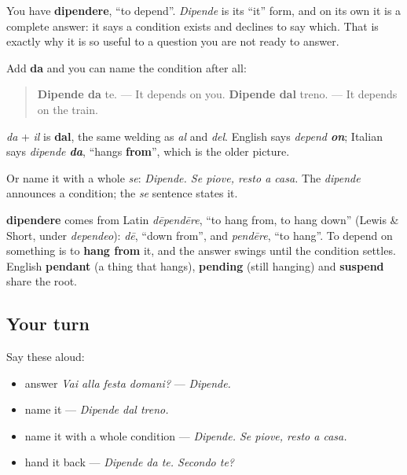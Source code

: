 You have \textbf{dipendere}, \textquotedblleft{}to depend\textquotedblright{}. \emph{Dipende} is its \textquotedblleft{}it\textquotedblright{} form, and on its own it is a complete answer: it says a condition exists and declines to say which. That is exactly why it is so useful to a question you are not ready to answer.

\begin{grammarlens}[title={Grammar Lens: dipende da}]
Add \textbf{da} and you can name the condition after all:

\begin{quote}
\textbf{Dipende da} te. — It depends on you. \textbf{Dipende dal} treno. — It depends on the train.
\end{quote}

\emph{da} + \emph{il} is \textbf{dal}, the same welding as \emph{al} and \emph{del}. English says \emph{depend \textbf{on}}; Italian says \emph{dipende \textbf{da}}, \textquotedblleft{}hangs \textbf{from}\textquotedblright{}, which is the older picture.

Or name it with a whole \emph{se}: \emph{Dipende. Se piove, resto a casa.} The \emph{dipende} announces a condition; the \emph{se} sentence states it.
\end{grammarlens}

\begin{cousinweb}
\textbf{dipendere} comes from Latin \emph{dēpendēre}, \textquotedblleft{}to hang from, to hang down\textquotedblright{} (Lewis \& Short, under \emph{dependeo}): \emph{dē}, \textquotedblleft{}down from\textquotedblright{}, and \emph{pendēre}, \textquotedblleft{}to hang\textquotedblright{}. To depend on something is to \textbf{hang from} it, and the answer swings until the condition settles. English \textbf{pendant} (a thing that hangs), \textbf{pending} (still hanging) and \textbf{suspend} share the root.
\end{cousinweb}

\subsection*{Your turn}
Say these aloud:

\begin{itemize}
\raggedright
  \item answer \emph{Vai alla festa domani?} — \emph{Dipende.}
  \item name it — \emph{Dipende dal treno.}
  \item name it with a whole condition — \emph{Dipende. Se piove, resto a casa.}
  \item hand it back — \emph{Dipende da te. Secondo te?}
\end{itemize}


